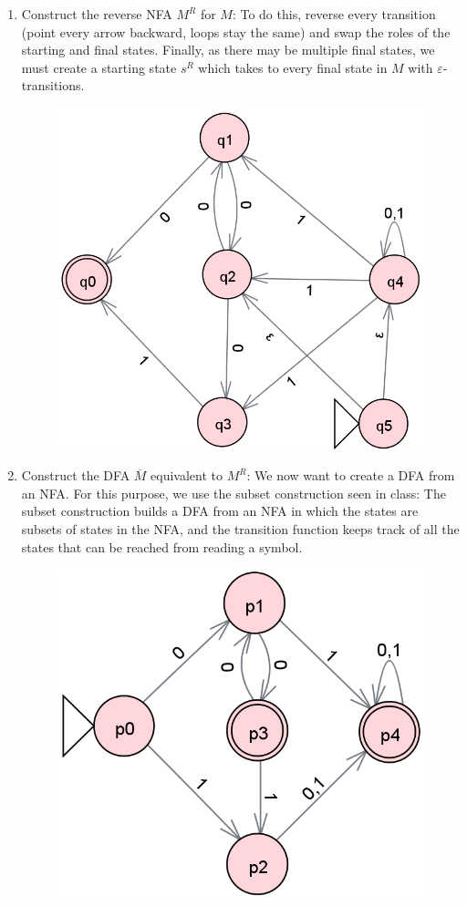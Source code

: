 \documentclass[12pt]{article}
\begin{document}
\begin{enumerate}
    \item Construct the reverse NFA $M^R$ for $M$: To do this, reverse every transition (point every arrow backward, loops stay the same) and swap the roles of the starting and final states. Finally, as there may be multiple final states, we must create a starting state $s^R$ which takes to every final state in $M$ with $\varepsilon$-transitions.

\begin{figure}[h]
    \centering
    \includegraphics[width=0.5\linewidth]{Second_Automaton_First_Step.png}
\end{figure}
    
    \item Construct the DFA $\overline{M}$ equivalent to $M^R$: We now want to create a DFA from an NFA. For this purpose, we use the subset construction seen in class: The subset construction builds a DFA from an NFA in which the states are subsets of states in the NFA, and the transition function keeps track of all the states that can be reached from reading a symbol.

\begin{figure}[h]
    \centering
    \includegraphics[width=0.5\linewidth]{Second_Automaton_Second_Step.png}
\end{figure}

\end{enumerate}
\end{document}
